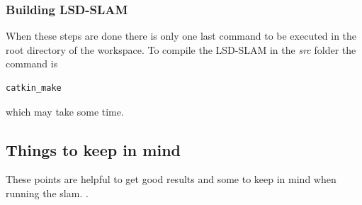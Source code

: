 \subsubsection{Building LSD-SLAM}\label{ref:buildinglsdslam}
When these steps are done there is only one last command to be executed in the root directory of the workspace. To compile the LSD-SLAM in the \textit{src} folder the command is \newline
\begin{lstlisting}[language=bash]
    catkin_make
\end{lstlisting}
which may take some time. 


\subsection{Things to keep in mind}\label{ref:lsdslamgetgoodresults}
These points are helpful to get good results and some to keep in mind when running the \gls{slam}. \cite{githublsdslamtum}.
